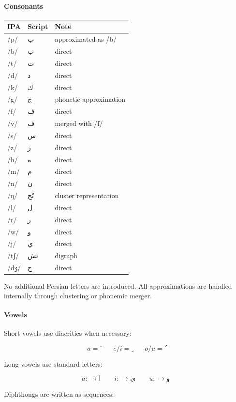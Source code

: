 \documentclass[12pt]{article}
\begin{document}
\paragraph{Consonants}

\begin{center}
\begin{tabular}{lll}
IPA & Script & Note \\
\hline
/p/ & ب & approximated as /b/ \\
/b/ & ب & direct \\
/t/ & ت & direct \\
/d/ & د & direct \\
/k/ & ك & direct \\
/g/ & ج & phonetic approximation \\
/f/ & ف & direct \\
/v/ & ف & merged with /f/ \\
/s/ & س & direct \\
/z/ & ز & direct \\
/h/ & ه & direct \\
/m/ & م & direct \\
/n/ & ن & direct \\
/ŋ/ & نْج & cluster representation \\
/l/ & ل & direct \\
/r/ & ر & direct \\
/w/ & و & direct \\
/j/ & ي & direct \\
/tʃ/ & تش & digraph \\
/dʒ/ & ج & direct \\
\end{tabular}
\end{center}

No additional Persian letters are introduced. All approximations are handled internally through clustering or phonemic merger.

\paragraph{Vowels}

Short vowels use diacritics when necessary:

\[
a = َ \qquad e/i = ِ \qquad o/u = ُ
\]

Long vowels use standard letters:

\[
a: \rightarrow ا \qquad i: \rightarrow ي \qquad u: \rightarrow و
\]

Diphthongs are written as sequences:
\end{document}
